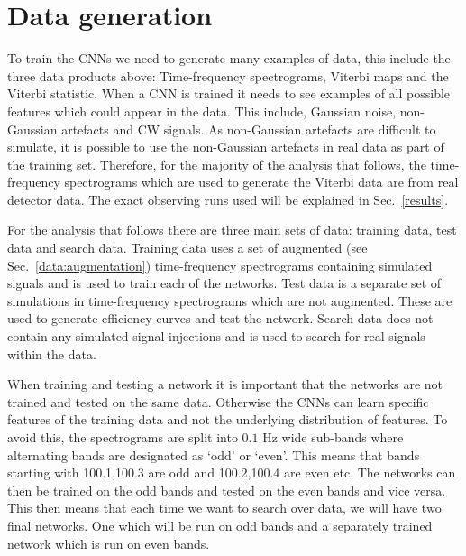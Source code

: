 \section{\label{machine:data} Data generation}

%

To train the \glspl{CNN} we need to generate many examples of data, this include the three data products above: Time-frequency spectrograms, Viterbi maps and the Viterbi statistic. 
When a \gls{CNN} is trained it needs to see examples of all possible features which could appear in the data. This include, Gaussian noise, non-Gaussian artefacts and \gls{CW} signals. 
As non-Gaussian artefacts are difficult to simulate, it is possible to use the non-Gaussian artefacts in real data as part of the training set.
Therefore, for the majority of the analysis that follows, the time-frequency spectrograms which are used to generate the Viterbi data are from real detector data. The exact observing runs used will be explained in Sec.~\ref{results}. 

For the analysis that follows there are three main sets of data: training data,
test data and search data. 
Training data uses a set of augmented (see Sec.~\ref{data:augmentation}) time-frequency spectrograms containing simulated signals and is used to train each of
the networks. 
Test data is a separate set of simulations in time-frequency spectrograms which are not augmented. These are used to generate
efficiency curves and test the network.
Search data does not contain any simulated signal injections and is used to search for real signals within the data.

%
When training and testing a network it is important that the networks are not
trained and tested on the same data. Otherwise the \glspl{CNN} can learn specific
features of the training data and not the underlying
distribution of features. To avoid this, the spectrograms are split into $0.1$
Hz wide sub-bands where alternating bands are designated as `odd' or `even'.
This means that bands starting with 100.1,100.3 are odd and 100.2,100.4 are
even etc. The networks can then be trained on the odd bands and tested on the
even bands and vice versa.
This then means that each time we want to search over data, we will have two final networks. One which will be run on odd bands and a separately trained network which is run on even bands. 



